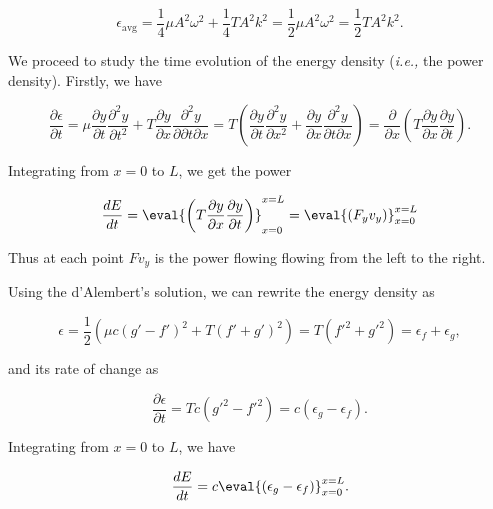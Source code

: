 \documentclass[a4paper,12pt]{report}
\begin{document}
\begin{equation}
	\epsilon_{\text{avg} }  = \frac{1}{4}\mu A^2\omega ^2+\frac{1}{4}T A^2k^2 = \frac{1}{2}\mu A^2\omega ^2 = \frac{1}{2} TA^2k^2. 
\end{equation}

We proceed to study the time evolution of the energy density (\textit{i.e.,} the power density). Firstly, we have

\begin{equation}
	\frac{\partial \epsilon  }{\partial t} = \mu \frac{\partial y}{\partial t} \frac{\partial^2 y}{\partial t^2} + T \frac{\partial y}{\partial x} \frac{\partial^2 y}{\partial \partial t \partial x} = T\left( \frac{\partial y}{\partial t} \frac{\partial^2 y}{\partial x^2}+ \frac{\partial y}{\partial x} \frac{\partial^2 y}{\partial t \partial x}    \right) = \frac{\partial }{\partial x} \left( T \frac{\partial y}{\partial x} \frac{\partial y}{\partial t}  \right).  
\end{equation}

Integrating from \(x = 0 \) to \(L\), we get the power

\begin{equation}
	\frac{dE}{dt} = \eval{\left( T \frac{\partial y}{\partial x} \frac{\partial y}{\partial t}  \right)}_{x=0}^{x=L} = \eval{\left( F_{y}v_{y}   \right)}_{x=0}^{x=L}  
\end{equation}

Thus at each point \(Fv_{y} \) is the power flowing flowing from the left to the right. 

Using the d'Alembert's solution, we can rewrite the energy density as 

\begin{equation}
	\epsilon = \frac{1}{2}\left( \mu c \left( g'-f' \right)^2 +T(f'+g')^2\right) = T(f'^2+g'^2) = \epsilon _{f} + \epsilon _{g}  ,
\end{equation}

and its rate of change as

\begin{equation}
	\frac{\partial \epsilon }{\partial t} =  Tc \left( g'^2-f'^2 \right) = c(\epsilon _{g} - \epsilon _{f}  ).
\end{equation}

Integrating from \(x=0 \) to \(L\), we have

\begin{equation}
	\frac{dE}{dt} = c \eval{(\epsilon _{g}- \epsilon _{f}  )}_{x=0}^{x=L}. 
\end{equation}
\end{document}
